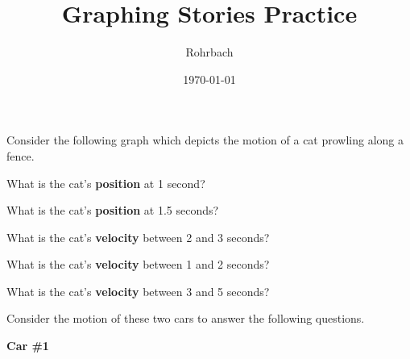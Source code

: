 \documentclass[12pt]{exam}
\title{Graphing Stories Practice}
\author{Rohrbach}
\date{\today}
\begin{document}
\maketitle

\begin{questions}

  \begin{EnvUplevel}
    Consider the following graph which depicts the motion of a cat prowling along a fence.

  \end{EnvUplevel}

  \question 
    What is the cat's {\bf position} at 1 second?
    \vs

  \question 
    What is the cat's {\bf position} at 1.5 seconds?
    \vs

  \question 
    What is the cat's {\bf velocity} between 2 and 3 seconds?
    \vs
    
  \question 
    What is the cat's {\bf velocity} between 1 and 2 seconds?
    \vs

  \question 
    What is the cat's {\bf velocity} between 3 and 5 seconds?
    \vs
  
  \pagebreak

  \begin{EnvUplevel}

    Consider the motion of these two cars to answer the following questions.
    
    \begin{multicols}{2}

      \begin{center}
        
        {\bf Car \#1}



\end{center}
\end{multicols}
\end{EnvUplevel}
\end{questions}
\end{document}
